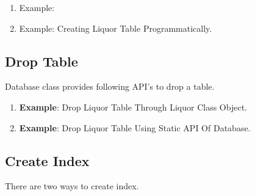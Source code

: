 		\begin{enumerate}

			\item \small 

				\par
				Example:
				

	
			\item \small 

				\par
				Example: Creating Liquor Table Programmatically.
				

		
		\end{enumerate}


	\subsection{Drop Table} Database class provides following API's to drop a table.

		\begin{enumerate}

			\item \small 

				\par
				\textbf{Example}: Drop Liquor Table Through Liquor Class Object.
				

			\item \small 

				\par
				\textbf{Example}: Drop Liquor Table Using Static API Of Database.
				

		\end{enumerate}
		

	\subsection{Create Index}
		
		\par
		There are two ways to create index.

